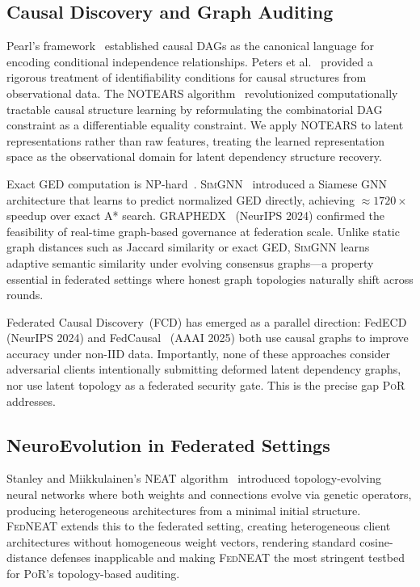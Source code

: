 \documentclass[journal]{IEEEtran}
\newcommand{\por}{\textsc{PoR}}
\newcommand{\fedneat}{\textsc{FedNEAT}}
\newcommand{\simgnn}{\textsc{SimGNN}}
\newcommand{\notears}{\textsc{NOTEARS}}
\begin{document}
\subsection{Causal Discovery and Graph Auditing}

Pearl's framework~\cite{pearl2009causality} established causal DAGs as the
canonical language for encoding conditional independence relationships.
Peters et al.~\cite{peters2017elements} provided a rigorous treatment of
identifiability conditions for causal structures from observational data.
The \notears{} algorithm~\cite{zheng2018notears} revolutionized computationally
tractable causal structure learning by reformulating the combinatorial DAG
constraint as a differentiable equality constraint. We apply \notears{} to
latent representations rather than raw features, treating the learned
representation space as the observational domain for latent dependency
structure recovery.

Exact GED computation is NP-hard~\cite{zeng2009ged}.
\simgnn{}~\cite{bai2019simgnn} introduced a Siamese GNN architecture
that learns to predict normalized GED directly, achieving
$\approx$$1720\times$ speedup over exact A* search.
GRAPHEDX~\cite{graphedx2024} (NeurIPS 2024) confirmed the feasibility
of real-time graph-based governance at federation scale. Unlike static
graph distances such as Jaccard similarity or exact GED, \simgnn{} learns
adaptive semantic similarity under evolving consensus graphs---a property
essential in federated settings where honest graph topologies naturally
shift across rounds.

Federated Causal Discovery~(FCD) has emerged as a parallel direction:
FedECD~\cite{fedecd2024} (NeurIPS 2024) and FedCausal~\cite{fedcausal2025}
(AAAI 2025) both use causal graphs to improve accuracy under non-IID data.
Importantly, none of these approaches consider adversarial clients
intentionally submitting deformed latent dependency graphs, nor use
latent topology as a federated security gate. This is the precise gap
\por{} addresses.

\subsection{NeuroEvolution in Federated Settings}

Stanley and Miikkulainen's NEAT algorithm~\cite{stanley2002neat} introduced
topology-evolving neural networks where both weights and connections evolve
via genetic operators, producing heterogeneous architectures from a minimal
initial structure. \fedneat{} extends this to the federated setting, creating
heterogeneous client architectures without homogeneous weight vectors, 
rendering standard cosine-distance defenses inapplicable and making
\fedneat{} the most stringent testbed for \por{}'s topology-based auditing.
\end{document}
